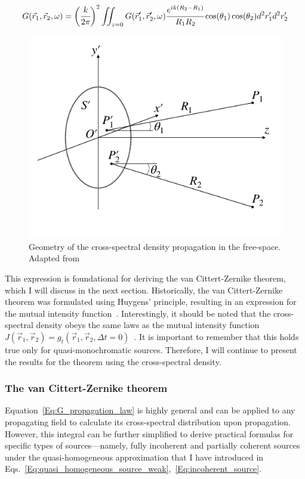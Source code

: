     \begin{align}
        G(\vec{r}_1, \vec{r}_2, \omega) = \bigg(\cfrac{k}{ 2 \pi} \bigg)^2 \iint_{z=0} G(\vec{r}'_1, \vec{r}'_2, \omega) \cfrac{e^{i k (R_2 - R_1)}}{R_1 R_2} \cos(\theta_1) \cos(\theta_2) d^2r'_1 d^2r'_2
        \label{Eq:G_propagation_law}
    \end{align}
    \begin{figure}
        \centering
        \includegraphics[width=0.95\linewidth]{content/images/Statistical_Optics/coh_prop_scheme.pdf}
        \captionsetup{justification=centering}
        \caption{Geometry of the cross-spectral density propagation in the free-space. Adapted from~}
        \label{Fig:coh_prop_scheme}
    \end{figure}
    This expression is foundational for deriving the van Cittert-Zernike theorem, which I will discuss in the next section. Historically, the van Cittert-Zernike theorem was formulated using Huygens' principle, resulting in an expression for the mutual intensity function~\cite{van_cittert_wahrscheinliche_1934, zernike_concept_1938}. Interestingly, it should be noted that the cross-spectral density obeys the same laws as the mutual intensity function $J(\vec{r}_1, \vec{r}_2) = g_t(\vec{r}_1, \vec{r}_2, \Delta t = 0)$~\cite{goodman_statistical_2015, mandel_optical_1995}. It is important to remember that this holds true only for quasi-monochromatic sources. Therefore, I will continue to present the results for the theorem using the cross-spectral density.

\subsubsection{The van Cittert-Zernike theorem}
    Equation~\ref{Eq:G_propagation_law} is highly general and can be applied to any propagating field to calculate its cross-spectral distribution upon propagation. However, this integral can be further simplified to derive practical formulas for specific types of sources—namely, fully incoherent and partially coherent sources under the quasi-homogeneous approximation that I have introduced in Eqs.~\ref{Eq:quasi_homogeneous_source_weak},~\ref{Eq:incoherent_source}. 
    

